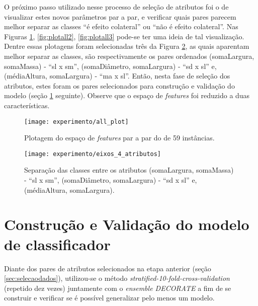 O próximo passo utilizado nesse processo de seleção de atributos foi o de visualizar estes novos parâmetros par a par, e verificar quais pares parecem melhor separar as classes ``é efeito colateral'' ou ``não é efeito colateral''. Nas Figuras \ref{fig:plotall1}, \ref{fig:plotall2}, \ref{fig:plotall3} pode-se ter uma ideia de tal visualização. Dentre essas plotagens foram selecionadas três da Figura \ref{fig:eixos_4_atributos}, as quais aparentam melhor separar as classes, são respectivamente os pares ordenados (somaLargura, somaMassa) - ``sl x sm'', (somaDiâmetro, somaLargura) - ``sd x sl'' e, (médiaAltura, somaLargura) - ``ma x sl''. Então, nesta fase de seleção dos atributos, estes foram os pares selecionados para construção e validação do modelo (seção \ref{sec:constvalidacao} seguinte). Observe que o espaço de \textit{features} foi reduzido a duas características.

\begin{figure}[!htb] \centering 
  \centering
  \texttt{[image: experimento/all\_plot]} 
  \caption{Plotagem do espaço de \textit{features} par a par do  de 59 instâncias.} 
  \label{fig:plotall1}
\end{figure}

\begin{figure}[!htb] \centering 
  \centering
  \texttt{[image: experimento/eixos\_4\_atributos]} 
  \caption{Separação das classes entre os atributos (somaLargura, somaMassa) - ``sl x sm'', (somaDiâmetro, somaLargura) - ``sd x sl'' e, (médiaAltura, somaLargura).} 
  \label{fig:eixos_4_atributos}
\end{figure}

\section{Construção e Validação do modelo de classificador}
\label{sec:constvalidacao}
Diante dos pares de atributos selecionados na etapa anterior (seção \ref{sec:selecaodados}), utilizou-se o método \textit{stratified-10-fold-cross-validation} (repetido dez vezes) juntamente com o \textit{ensemble DECORATE} a fim de se construir e verificar se é possível generalizar pelo menos um modelo. 

